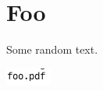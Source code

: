 \documentclass{article}
\begin{document}
\section{Foo}

Some random text.


\includegraphics{foo-img}
\end{document}

